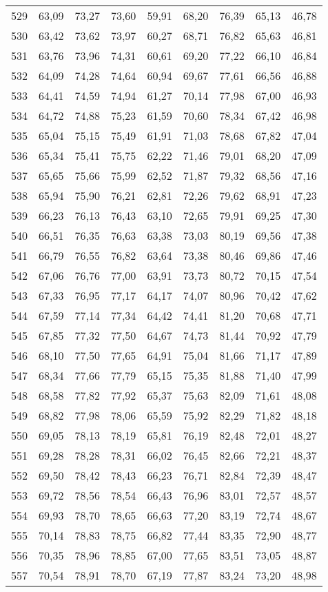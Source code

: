 \begin{longtable}{c c c c c c c c c}
529	& 63,09	& 73,27	& 73,60	& 59,91	& 68,20	& 76,39	& 65,13	& 46,78 \\
530	& 63,42	& 73,62	& 73,97	& 60,27	& 68,71	& 76,82	& 65,63	& 46,81 \\
531	& 63,76	& 73,96	& 74,31	& 60,61	& 69,20	& 77,22	& 66,10	& 46,84 \\
532	& 64,09	& 74,28	& 74,64	& 60,94	& 69,67	& 77,61	& 66,56	& 46,88 \\
533	& 64,41	& 74,59	& 74,94	& 61,27	& 70,14	& 77,98	& 67,00	& 46,93 \\
534	& 64,72	& 74,88	& 75,23	& 61,59	& 70,60	& 78,34	& 67,42	& 46,98 \\
535	& 65,04	& 75,15	& 75,49	& 61,91	& 71,03	& 78,68	& 67,82	& 47,04 \\
536	& 65,34	& 75,41	& 75,75	& 62,22	& 71,46	& 79,01	& 68,20	& 47,09 \\
537	& 65,65	& 75,66	& 75,99	& 62,52	& 71,87	& 79,32	& 68,56	& 47,16 \\
538	& 65,94	& 75,90	& 76,21	& 62,81	& 72,26	& 79,62	& 68,91	& 47,23 \\
539	& 66,23	& 76,13	& 76,43	& 63,10	& 72,65	& 79,91	& 69,25	& 47,30 \\
540	& 66,51	& 76,35	& 76,63	& 63,38	& 73,03	& 80,19	& 69,56	& 47,38 \\
541	& 66,79	& 76,55	& 76,82	& 63,64	& 73,38	& 80,46	& 69,86	& 47,46 \\
542	& 67,06	& 76,76	& 77,00	& 63,91	& 73,73	& 80,72	& 70,15	& 47,54 \\
543	& 67,33	& 76,95	& 77,17	& 64,17	& 74,07	& 80,96	& 70,42	& 47,62 \\
544	& 67,59	& 77,14	& 77,34	& 64,42	& 74,41	& 81,20	& 70,68	& 47,71 \\
545	& 67,85	& 77,32	& 77,50	& 64,67	& 74,73	& 81,44	& 70,92	& 47,79 \\
546	& 68,10	& 77,50	& 77,65	& 64,91	& 75,04	& 81,66	& 71,17	& 47,89 \\
547	& 68,34	& 77,66	& 77,79	& 65,15	& 75,35	& 81,88	& 71,40	& 47,99 \\
548	& 68,58	& 77,82	& 77,92	& 65,37	& 75,63	& 82,09	& 71,61	& 48,08 \\
549	& 68,82	& 77,98	& 78,06	& 65,59	& 75,92	& 82,29	& 71,82	& 48,18 \\
550	& 69,05	& 78,13	& 78,19	& 65,81	& 76,19	& 82,48	& 72,01	& 48,27 \\
551	& 69,28	& 78,28	& 78,31	& 66,02	& 76,45	& 82,66	& 72,21	& 48,37 \\
552	& 69,50	& 78,42	& 78,43	& 66,23	& 76,71	& 82,84	& 72,39	& 48,47 \\
553	& 69,72	& 78,56	& 78,54	& 66,43	& 76,96	& 83,01	& 72,57	& 48,57 \\
554	& 69,93	& 78,70	& 78,65	& 66,63	& 77,20	& 83,19	& 72,74 &	48,67 \\
555	& 70,14	& 78,83	& 78,75	& 66,82	& 77,44	& 83,35	& 72,90	& 48,77 \\
556	& 70,35	& 78,96	& 78,85	& 67,00	& 77,65	& 83,51	& 73,05	& 48,87 \\
557	& 70,54	& 78,91	& 78,70	& 67,19	& 77,87	& 83,24	& 73,20	& 48,98 \\
\bottomrule
    \end{longtable}